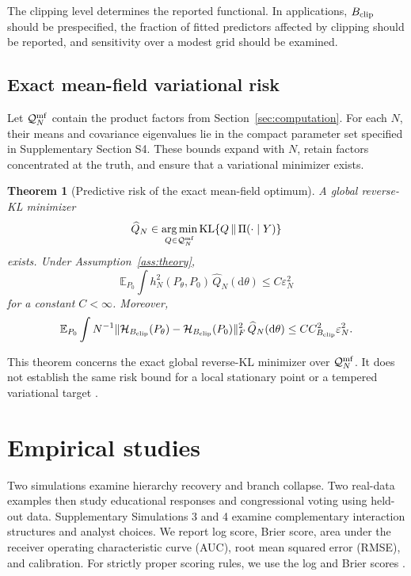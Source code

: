 \documentclass[
  12pt]{article}
\newtheorem{theorem}{Theorem}[section]
\theoremstyle{definition}
\theoremstyle{plain}
\newcommand{\E}{\mathbb E}
\newcommand{\KL}{\operatorname{KL}}
\newcommand{\calQ}{\mathcal Q}
\newcommand{\dd}{\mathrm d}
\newcommand{\eps}{\varepsilon}
\newcommand{\argmin}{\operatorname*{arg\,min}}
\begin{document}
The clipping level determines the reported functional. In applications, $B_{\rm clip}$ should be prespecified, the fraction of fitted predictors affected by clipping should be reported, and sensitivity over a modest grid should be examined.

\subsection{Exact mean-field variational risk}

Let $\calQ_N^{\rm mf}$ contain the product factors from Section~\ref{sec:computation}. For each $N$, their means and covariance eigenvalues lie in the compact parameter set specified in Supplementary Section S4. These bounds expand with $N$, retain factors concentrated at the truth, and ensure that a variational minimizer exists.

\begin{theorem}[Predictive risk of the exact mean-field optimum]
\label{thm:vb}
A global reverse-KL minimizer
\[
\widehat Q_N\in\argmin_{Q\in\calQ_N^{\rm mf}}
\KL\{Q\,\|\,\Pi(\cdot\mid Y)\}
\]
exists. Under Assumption~\ref{ass:theory},
\[
\E_{P_0}\int h_N^2(P_\theta,P_0)\,\widehat Q_N(\dd\theta)
\le C\eps_N^2
\]
for a constant $C<\infty$. Moreover,
\[
\E_{P_0}\int
N^{-1}\|\mathcal H_{B_{\rm clip}}(P_\theta)-\mathcal H_{B_{\rm clip}}(P_0)\|_F^2
\,\widehat Q_N(\dd\theta)
\le C C_{B_{\rm clip}}^2\eps_N^2.
\]
\end{theorem}


This theorem concerns the exact global reverse-KL minimizer over $\calQ_N^{\rm mf}$. It does not establish the same risk bound for a local stationary point or a tempered variational target \citep{alquier_2020_ConcentrationTemperedPosteriors}.

\section{Empirical studies}
\label{sec:experiments}

Two simulations examine hierarchy recovery and branch collapse. Two real-data examples then study educational responses and congressional voting using held-out data. Supplementary Simulations 3 and 4 examine complementary interaction structures and analyst choices. We report log score, Brier score, area under the receiver operating characteristic curve (AUC), root mean squared error (RMSE), and calibration. For strictly proper scoring rules, we use the log and Brier scores \citep{gneiting_2007_StrictlyProperScoring}.
\end{document}
